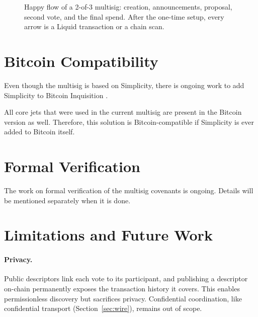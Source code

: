 \documentclass[11pt]{article}
\begin{document}
\begin{figure}[p]
        \caption{Happy flow of a 2-of-3 multisig: creation, announcements, proposal, second vote, and the final spend. After the one-time setup, every arrow is a Liquid transaction or a chain scan.}
        \label{fig:sequence}
    \end{figure}


    \section{Bitcoin Compatibility}

    Even though the multisig is based on Simplicity, there is ongoing work to add Simplicity to Bitcoin Inquisition \cite{bitcoin-inquisition-binana-simplicity,bitcoin-inquisition-simplicity-impl}.

    All core jets that were used in the current multisig are present in the Bitcoin version as well. Therefore, this solution is Bitcoin-compatible if Simplicity is ever added to Bitcoin itself.


    \section{Formal Verification}

    The work on formal verification of the multisig covenants is ongoing. Details will be mentioned separately when it is done.


    \section{Limitations and Future Work}
    \label{sec:limitations}

    \paragraph{Privacy.}
    Public descriptors link each vote to its participant, and publishing a descriptor on-chain permanently exposes the transaction history it covers. This enables permissionless discovery but sacrifices privacy. Confidential coordination, like confidential transport (Section~\ref{sec:wire}), remains out of scope.
\end{document}
